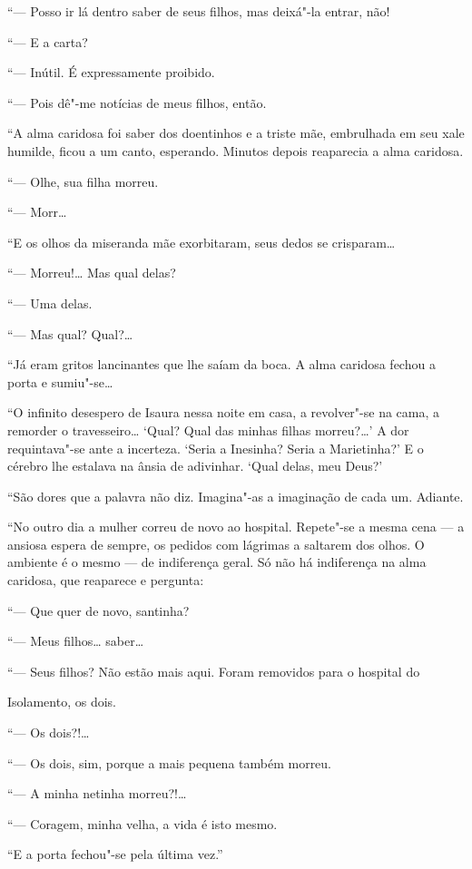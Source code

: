 ``--- Posso ir lá dentro saber de seus filhos, mas deixá"-la entrar, não!

``--- E a carta?

``--- Inútil. É expressamente proibido.

``--- Pois dê"-me notícias de meus filhos, então.

``A alma caridosa foi saber dos doentinhos e a triste mãe, embrulhada em
seu xale humilde, ficou a um canto, esperando. Minutos depois reaparecia
a alma caridosa.

``--- Olhe, sua filha morreu.

``--- Morr\ldots{}

``E os olhos da miseranda mãe exorbitaram, seus dedos se crisparam\ldots{}

``--- Morreu!\ldots{} Mas qual delas?

``--- Uma delas.

``--- Mas qual? Qual?\ldots{}

``Já eram gritos lancinantes que lhe saíam da boca. A alma caridosa
fechou a porta e sumiu"-se\ldots{}

``O infinito desespero de Isaura nessa noite em casa, a revolver"-se na
cama, a remorder o travesseiro\ldots{} `Qual? Qual das minhas filhas
morreu?\ldots{}' A dor requintava"-se ante a incerteza. `Seria a Inesinha?
Seria a Marietinha?' E o cérebro lhe estalava na ânsia de adivinhar.
`Qual delas, meu Deus?'

``São dores que a palavra não diz. Imagina"-as a imaginação de cada um.
Adiante.

``No outro dia a mulher correu de novo ao hospital. Repete"-se a mesma
cena --- a ansiosa espera de sempre, os pedidos com lágrimas a saltarem
dos olhos. O ambiente é o mesmo --- de indiferença geral. Só não há
indiferença na alma caridosa, que reaparece e pergunta:

``--- Que quer de novo, santinha?

``--- Meus filhos\ldots{} saber\ldots{}

``--- Seus filhos? Não estão mais aqui. Foram removidos para o hospital
do

Isolamento, os dois.

``--- Os dois?!\ldots{}

``--- Os dois, sim, porque a mais pequena também morreu.

``--- A minha netinha morreu?!\ldots{}

``--- Coragem, minha velha, a vida é isto mesmo.

``E a porta fechou"-se pela última vez.''

